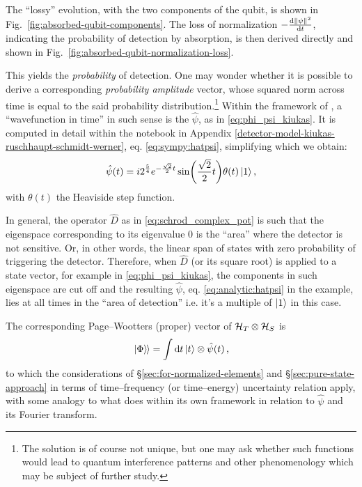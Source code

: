The ``lossy'' evolution, with the two components of the qubit, is shown in Fig.~\ref{fig:absorbed-qubit-components}.
The loss of normalization $-\dv{\norm{\psi}^2}{t}$, indicating the probability of detection by absorption,
is then derived directly and shown in Fig.~\ref{fig:absorbed-qubit-normalization-loss}.

This yields the \emph{probability} of detection.
One may wonder whether it is possible to derive a corresponding \emph{probability amplitude} vector,
whose squared norm across time is equal to the said probability distribution.\footnote{
  The solution is of course not unique, but one may ask whether such functions would lead
  to quantum interference patterns and other phenomenology which may be subject of further study.
}
Within the framework of \cite{RuschhauptAbsorption}, a ``wavefunction in time'' in such sense
is the $\hat{\psi}$, as in \eqref{eq:phi_psi_kiukas}.
It is computed in detail within the
notebook in Appendix \ref{detector-model-kiukas-ruschhaupt-schmidt-werner}, eq. \eqref{eq:sympy:hatpsi},
simplifying which we obtain:
\begin{equation}\label{eq:analytic:hatpsi}
  \hat{\psi}(t) =
    i 2^{\frac{5}{4}} e^{-\frac{\sqrt{2}}{2}t}\sin(\frac{\sqrt{2}}{2}t) \theta(t)
    \ket{1}
    \text{,}
\end{equation}
with $\theta(t)$ the Heaviside step function.

In general, the operator $\hat{D}$ as in \eqref{eq:schrod_complex_pot}
is such that the eigenspace corresponding to its eigenvalue $0$
is the ``area'' where the detector is not sensitive. Or, in other words,
the linear span of states with zero probability of triggering the detector.
Therefore, when $\hat{D}$ (or its square root) is applied to a state vector,
for example in \eqref{eq:phi_psi_kiukas},
the components in such eigenspace are cut off and the resulting
$\hat{\psi}$, eq. \eqref{eq:analytic:hatpsi} in the example, lies at all times in the ``area of detection''
i.e. it's a multiple of $\ket{1}$ in this case.

The corresponding Page--Wootters (proper) vector of $\mathcal{H}_T \otimes \mathcal{H}_S$ is
\begin{equation*}
  \left.\left| \Phi \right\rangle\hspace{-0.115em}\right\rangle = \int \dd{t} \ket{t} \otimes \hat{\psi}(t) \,\text{,}
\end{equation*}
to which the considerations of \S\ref{sec:for-normalized-elements}
and \S\ref{sec:pure-state-approach} in terms of time--frequency
(or time--energy) uncertainty relation apply, with some analogy
to what \cite{RuschhauptAbsorption} does within its own framework
in relation to $\hat{\psi}$ and its Fourier transform.